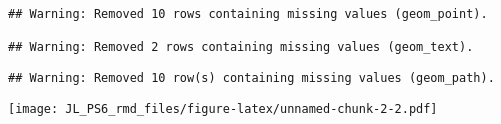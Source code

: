 \documentclass[
]{article}
\begin{document}
\begin{verbatim}
## Warning: Removed 10 rows containing missing values (geom_point).

## Warning: Removed 2 rows containing missing values (geom_text).
\end{verbatim}

\begin{verbatim}
## Warning: Removed 10 row(s) containing missing values (geom_path).
\end{verbatim}

\texttt{[image: JL\_PS6\_rmd\_files/figure-latex/unnamed-chunk-2-2.pdf]}
\end{document}
